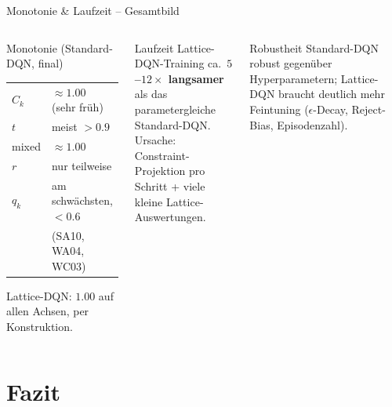 \documentclass[aspectratio=169, 11pt]{beamer}
\begin{document}
\begin{frame}{Monotonie \& Laufzeit -- Gesamtbild}
  \begin{columns}[T]
      \begin{block}{Monotonie (Standard-DQN, final)}
        \begin{tabular}{l l}
          $C_k$   & $\approx 1.00$ (sehr früh) \\
          $t$     & meist $>0.9$ \\
          mixed   & $\approx 1.00$ \\
          $r$     & nur teilweise \\
          $q_k$   & am schwächsten, $<0.6$ \\
                  & \small(SA10, WA04, WC03)
        \end{tabular}
        \medskip
        Lattice-DQN: $1.00$ auf allen Achsen, per Konstruktion.
      \end{block}
      \begin{block}{Laufzeit}
        Lattice-DQN-Training ca.\ \textbf{$5$--$12\times$ langsamer} als das
        parametergleiche Standard-DQN.
        \\[0.4em]
        Ursache: Constraint-Projektion pro Schritt + viele kleine Lattice-Auswertungen.
      \end{block}
      \begin{block}{Robustheit}
        Standard-DQN robust gegenüber Hyperparametern;
        Lattice-DQN braucht deutlich mehr Feintuning ($\epsilon$-Decay, Reject-Bias, Episodenzahl).
      \end{block}
  \end{columns}
\end{frame}

\section{Fazit}
\end{document}
